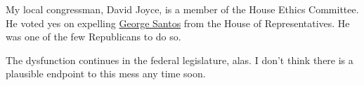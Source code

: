 My local congressman, David Joyce, is a member of the House Ethics
Committee. He voted yes on expelling
\href{https://en.wikipedia.org/w/index.php?title=George_Santos&oldid=1187817498}{George
Santos} from the House of Representatives. He was one of the few
Republicans to do so.

The dysfunction continues in the federal legislature, alas. I don't
think there is a plausible endpoint to this mess any time soon.
